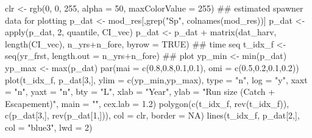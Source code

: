 \documentclass[11pt,]{article}
\newenvironment{Shaded}{}{}
\newcommand{\CommentTok}[1]{\textcolor[rgb]{0.00,0.50,0.00}{#1}}
\newcommand{\DataTypeTok}[1]{#1}
\newcommand{\DecValTok}[1]{#1}
\newcommand{\FloatTok}[1]{#1}
\newcommand{\KeywordTok}[1]{\textcolor[rgb]{0.00,0.00,1.00}{#1}}
\newcommand{\NormalTok}[1]{#1}
\newcommand{\OperatorTok}[1]{#1}
\newcommand{\OtherTok}[1]{\textcolor[rgb]{1.00,0.25,0.00}{#1}}
\newcommand{\StringTok}[1]{\textcolor[rgb]{0.00,0.50,0.50}{#1}}
\begin{document}
\begin{Shaded}
\begin{Highlighting}[]
\NormalTok{clr <-}\StringTok{ }\KeywordTok{rgb}\NormalTok{(}\DecValTok{0}\NormalTok{, }\DecValTok{0}\NormalTok{, }\DecValTok{255}\NormalTok{, }\DataTypeTok{alpha =} \DecValTok{50}\NormalTok{, }\DataTypeTok{maxColorValue =} \DecValTok{255}\NormalTok{)}
\CommentTok{## estimated spawner data for plotting}
\NormalTok{p_dat <-}\StringTok{ }\NormalTok{mod_res[,}\KeywordTok{grep}\NormalTok{(}\StringTok{"Sp"}\NormalTok{, }\KeywordTok{colnames}\NormalTok{(mod_res))]}
\NormalTok{p_dat <-}\StringTok{ }\KeywordTok{apply}\NormalTok{(p_dat, }\DecValTok{2}\NormalTok{, quantile, CI_vec)}
\NormalTok{p_dat <-}\StringTok{ }\NormalTok{p_dat }\OperatorTok{+}\StringTok{ }\KeywordTok{matrix}\NormalTok{(dat_harv, }\KeywordTok{length}\NormalTok{(CI_vec), n_yrs}\OperatorTok{+}\NormalTok{n_fore, }\DataTypeTok{byrow =} \OtherTok{TRUE}\NormalTok{)}
\CommentTok{## time seq}
\NormalTok{t_idx_f <-}\StringTok{ }\KeywordTok{seq}\NormalTok{(yr_frst, }\DataTypeTok{length.out =}\NormalTok{ n_yrs}\OperatorTok{+}\NormalTok{n_fore)}
\CommentTok{## plot}
\NormalTok{yp_min <-}\StringTok{ }\KeywordTok{min}\NormalTok{(p_dat)}
\NormalTok{yp_max <-}\StringTok{ }\KeywordTok{max}\NormalTok{(p_dat)}
\KeywordTok{par}\NormalTok{(}\DataTypeTok{mai =} \KeywordTok{c}\NormalTok{(}\FloatTok{0.8}\NormalTok{,}\FloatTok{0.8}\NormalTok{,}\FloatTok{0.1}\NormalTok{,}\FloatTok{0.1}\NormalTok{), }\DataTypeTok{omi =} \KeywordTok{c}\NormalTok{(}\FloatTok{0.5}\NormalTok{,}\FloatTok{0.2}\NormalTok{,}\FloatTok{0.1}\NormalTok{,}\FloatTok{0.2}\NormalTok{))}
\KeywordTok{plot}\NormalTok{(t_idx_f, p_dat[}\DecValTok{3}\NormalTok{,], }\DataTypeTok{ylim =} \KeywordTok{c}\NormalTok{(yp_min,yp_max), }\DataTypeTok{type =} \StringTok{"n"}\NormalTok{,}
     \DataTypeTok{log =} \StringTok{"y"}\NormalTok{, }\DataTypeTok{xaxt =} \StringTok{"n"}\NormalTok{, }\DataTypeTok{yaxt =} \StringTok{"n"}\NormalTok{, }\DataTypeTok{bty =} \StringTok{"L"}\NormalTok{,}
     \DataTypeTok{xlab =} \StringTok{"Year"}\NormalTok{, }\DataTypeTok{ylab =} \StringTok{"Run size (Catch + Escapement)"}\NormalTok{, }\DataTypeTok{main =} \StringTok{""}\NormalTok{, }\DataTypeTok{cex.lab =} \FloatTok{1.2}\NormalTok{)}
\KeywordTok{polygon}\NormalTok{(}\KeywordTok{c}\NormalTok{(t_idx_f, }\KeywordTok{rev}\NormalTok{(t_idx_f)), }\KeywordTok{c}\NormalTok{(p_dat[}\DecValTok{3}\NormalTok{,], }\KeywordTok{rev}\NormalTok{(p_dat[}\DecValTok{1}\NormalTok{,])),}
        \DataTypeTok{col =}\NormalTok{ clr, }\DataTypeTok{border =} \OtherTok{NA}\NormalTok{)}
\KeywordTok{lines}\NormalTok{(t_idx_f, p_dat[}\DecValTok{2}\NormalTok{,], }\DataTypeTok{col =} \StringTok{"blue3"}\NormalTok{, }\DataTypeTok{lwd =} \DecValTok{2}\NormalTok{)}

\end{Highlighting}
\end{Shaded}
\end{document}
